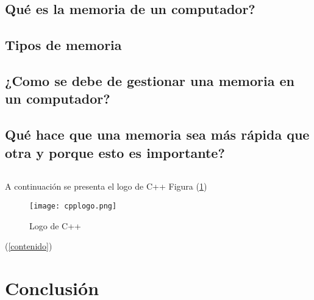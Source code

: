 \documentclass{article}
\begin{document}
    \subsection{Qué es la memoria de un computador?}
    \subsection{Tipos de memoria}
    \subsection{¿Como se debe de gestionar una memoria en un computador?}
    \subsection{Qué hace que una memoria sea más rápida que otra y porque esto es importante?}
    
\cite{dirac}

\begin{lstlisting}

\end{lstlisting}

A continuación se presenta el logo de C++ Figura (\ref{fig:cpplogo})

\begin{figure}[h]
\texttt{[image: cpplogo.png]}
\centering
\caption{Logo de C++}
\label{fig:cpplogo}
\end{figure}

(\ref{contenido})

\section{Conclusión} \label{conclulsion}



\end{document}
